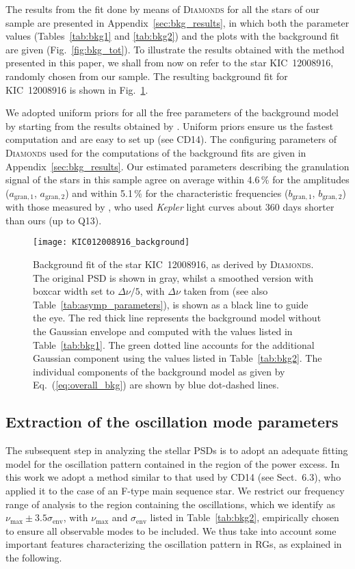 \documentclass[structabstract]{aa}
\newcommand{\kepler}{\textit{Kepler} }
\newcommand{\numax}{\nu_\mathrm{max}}
\newcommand{\diamonds}{\textsc{D\large{iamonds}}}
\newcommand{\kic}{KIC~12008916}
\begin{document}
The results from the fit done by means of \diamonds\,\,for all the stars of our sample are presented in Appendix~\ref{sec:bkg_results}, in which both the parameter values (Tables~\ref{tab:bkg1} and \ref{tab:bkg2}) and the plots with the background fit are given (Fig.~\ref{fig:bkg_tot}). To illustrate the results obtained with the method presented in this paper, we shall from now on refer to the star \kic, randomly chosen from our sample. The resulting background fit for \kic\,\,is shown in Fig.~\ref{fig:bkg_case}. 

We adopted uniform priors for all the free parameters of the background model by starting from the results obtained by \cite{Kallinger14}. Uniform priors ensure us the fastest computation and are easy to set up (see CD14). The configuring parameters of \diamonds\,\,used for the computations of the background fits are given in Appendix~\ref{sec:bkg_results}. Our estimated parameters describing the granulation signal of the stars in this sample agree on average within 4.6\,\% for the amplitudes ($a_\mathrm{gran,1}$, $a_\mathrm{gran,2}$) and within 5.1\,\% for the characteristic frequencies ($b_\mathrm{gran,1}$, $b_\mathrm{gran,2}$) with those measured by \cite{Kallinger14}, who used \kepler light curves about 360 days shorter than ours (up to Q13).

\begin{figure}
   \centering
   \texttt{[image: KIC012008916\_background]}
      \caption{Background fit of the star \kic, as derived by \diamonds. The original PSD is shown in gray, whilst a smoothed version with boxcar width set to $\Delta\nu/5$, with $\Delta\nu$ taken from \cite{Mosser12Cat} (see also Table~\ref{tab:asymp_parameters}), is shown as a black line to guide the eye. The red thick line represents the background model without the Gaussian envelope and computed with the values listed in Table~\ref{tab:bkg1}. The green dotted line accounts for the additional Gaussian component using the values listed in Table~\ref{tab:bkg2}. The individual components of the background model as given by Eq.~(\ref{eq:overall_bkg}) are shown by blue dot-dashed lines.}
    \label{fig:bkg_case}
\end{figure}

\subsection{Extraction of the oscillation mode parameters}
\label{sec:extraction}
The subsequent step in analyzing the stellar PSDs is to adopt an adequate fitting model for the oscillation pattern contained in the region of the power excess. In this work we adopt a method similar to that used by CD14 (see Sect.~6.3), who applied it to the case of an F-type main sequence star. We restrict our frequency range of analysis to the region containing the oscillations, which we identify as $\numax \pm 3.5 \sigma_\mathrm{env}$, with $\numax$ and $\sigma_\mathrm{env}$ listed in Table~\ref{tab:bkg2}, empirically chosen to ensure all observable modes to be included. We thus take into account some important features characterizing the oscillation pattern in RGs, as explained in the following. 
\end{document}
